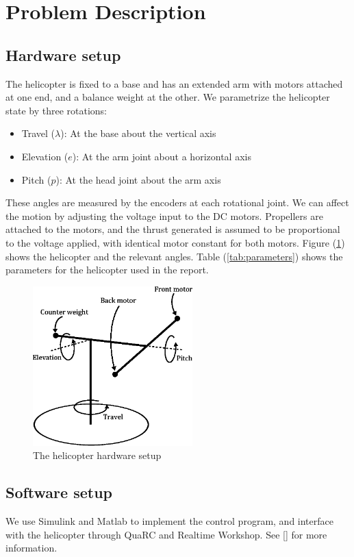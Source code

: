 \section{Problem Description}\label{sec:prob_descr}

\subsection{Hardware setup}
The helicopter is fixed to a base and has an extended arm with motors attached at one end,
and a balance weight at the other. We parametrize the helicopter state by three rotations:
\begin{itemize}
    \item Travel ($\lambda$): At the base about the vertical axis
    \item Elevation ($e$): At the arm joint about a horizontal axis
    \item Pitch ($p$): At the head joint about the arm axis
\end{itemize}
These angles are measured by the encoders at each rotational joint. We can affect the motion by adjusting the voltage input to the DC motors. Propellers are attached to the motors, and the thrust generated is assumed to be proportional to the voltage applied, with identical motor constant for both motors. Figure (\ref{fig:hardware}) shows the helicopter and the relevant angles. Table (\ref{tab:parameters}) shows the parameters for the helicopter used in the report.

\begin{figure}[htb]
	\centering
	\includegraphics[width = 0.55\textwidth]{figures/hardware_setup.eps}
	\caption{The helicopter hardware setup}
	\label{fig:hardware}
\end{figure}

\subsection{Software setup}
We use Simulink and Matlab to implement the control program, and interface with the helicopter through QuaRC and Realtime Workshop. See [\cite{LabExercise}] for more information.

